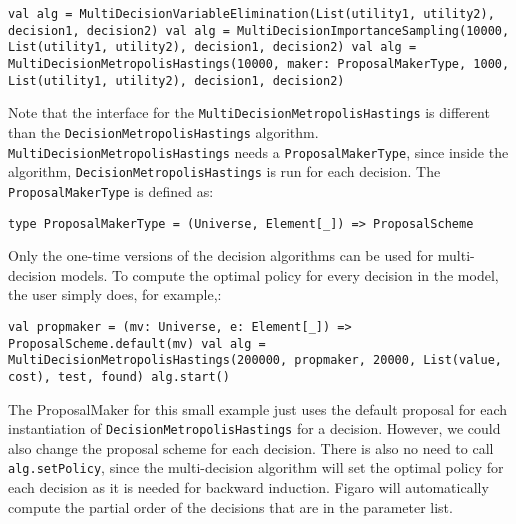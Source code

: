 \begin{flushleft}
\texttt{val alg = MultiDecisionVariableElimination(List(utility1, utility2), decision1, decision2)
\newline val alg = MultiDecisionImportanceSampling(10000,	List(utility1, utility2), decision1, decision2)
\newline val alg = MultiDecisionMetropolisHastings(10000, maker: ProposalMakerType, 1000, List(utility1, utility2), decision1, decision2)
}
\end{flushleft}

Note that the interface for the \texttt{MultiDecisionMetropolisHastings} is different than the \texttt{DecisionMetropolisHastings} algorithm. \texttt{MultiDec\-isionMetropolisHastings} needs a \texttt{ProposalMakerType}, since inside the algorithm, \texttt{Decision\-MetropolisHastings} is run for each decision. The \texttt{ProposalMakerType} is defined as:

\begin{flushleft}
\texttt{type ProposalMakerType = (Universe, Element[\_]) => ProposalScheme}
\end{flushleft}

Only the one-time versions of the decision algorithms can be used for multi-decision models. To compute the optimal policy for every decision in the model, the user simply does, for example,:

\begin{flushleft}
\texttt{val propmaker = (mv: Universe, e: Element[\_]) => ProposalScheme.default(mv)
val alg = MultiDecisionMetropolisHastings(200000, propmaker, 20000, List(value, cost), test, found)
\newline alg.start()}
\end{flushleft}

The ProposalMaker for this small example just uses the default proposal for each instantiation of \texttt{DecisionMetropolisHastings} for a decision. However, we could also change the proposal scheme for each decision. There is also no need to call \texttt{alg.setPolicy}, since the multi-decision algorithm will set the optimal policy for each decision as it is needed for backward induction. Figaro will automatically compute the partial order of the decisions that are in the parameter list.
